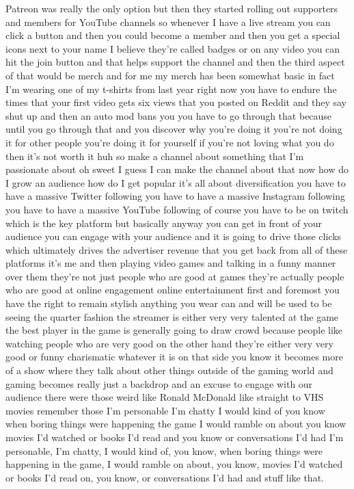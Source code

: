 \documentclass{article}%
\begin{document}
Patreon was really the only option but then they started rolling out supporters and members for YouTube channels so whenever I have a live stream you can click a button and then you could become a member and then you get a special icons next to your name I believe they're called badges or on any video you can hit the join button and that helps support the channel and then the third aspect of that would be merch and for me my merch has been somewhat basic in fact I'm wearing one of my t{-}shirts from last year right now you have to endure the times that your first video gets six views that you posted on Reddit and they say shut up and then an auto mod bans you you have to go through that because until you go through that and you discover why you're doing it you're not doing it for other people you're doing it for yourself if you're not loving what you do then it's not worth it huh so make a channel about something that I'm passionate about oh sweet I guess I can make the channel about that now how do I grow an audience how do I get popular it's all about diversification you have to have a massive Twitter following you have to have a massive Instagram following you have to have a massive YouTube following of course you have to be on twitch which is the key platform but basically anyway you can get in front of your audience you can engage with your audience and it is going to drive those clicks which ultimately drives the advertiser revenue that you get back from all of these platforms it's me and then playing video games and talking in a funny manner over them they're not just people who are good at games they're actually people who are good at online engagement online entertainment first and foremost you have the right to remain stylish anything you wear can and will be used to be seeing the quarter fashion the streamer is either very very talented at the game the best player in the game is generally going to draw crowd because people like watching people who are very good on the other hand they're either very very good or funny charismatic whatever it is on that side you know it becomes more of a show where they talk about other things outside of the gaming world and gaming becomes really just a backdrop and an excuse to engage with our audience there were those weird like Ronald McDonald like straight to VHS movies remember those I'm personable I'm chatty I would kind of you know when boring things were happening the game I would ramble on about you know movies I'd watched or books I'd read and you know or conversations I'd had  I'm personable, I'm chatty, I would kind of, you know, when boring things were happening in the game, I would ramble on about, you know, movies I'd watched or books I'd read on, you know, or conversations I'd had and stuff like that.%
\end{document}
